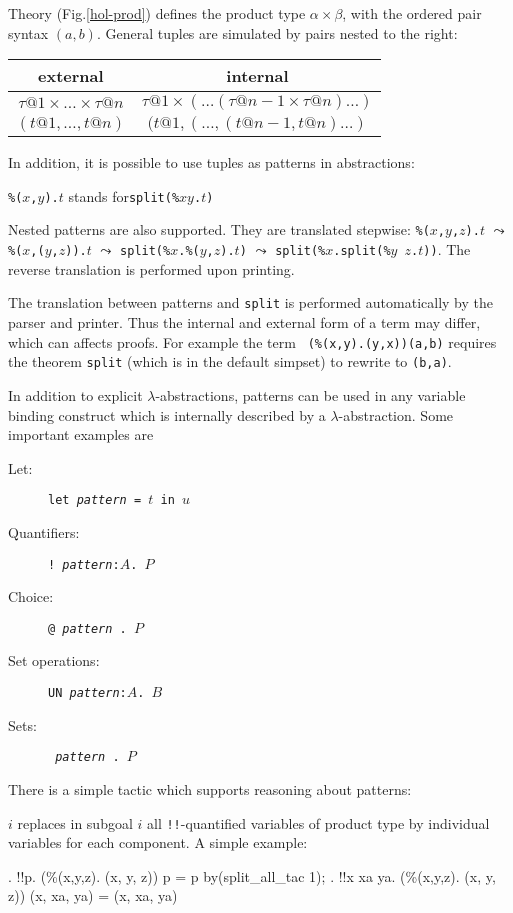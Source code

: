 Theory  (Fig.\ts\ref{hol-prod}) defines the product type
$\alpha\times\beta$, with the ordered pair syntax $(a, b)$.  General
tuples are simulated by pairs nested to the right:
\begin{center}
\begin{tabular}{|c|c|}
\hline
external & internal \\
\hline
$\tau@1 \times \dots \times \tau@n$ & $\tau@1 \times (\dots (\tau@{n-1} \times \tau@n)\dots)$ \\
\hline
$(t@1,\dots,t@n)$ & $(t@1,(\dots,(t@{n-1},t@n)\dots)$ \\
\hline
\end{tabular}
\end{center}
In addition, it is possible to use tuples
as patterns in abstractions:
\begin{center}
{\tt\%($x$,$y$).$t$} \quad stands for\quad \texttt{split(\%$x$\thinspace$y$.$t$)} 
\end{center}
Nested patterns are also supported.  They are translated stepwise:
{\tt\%($x$,$y$,$z$).$t$} $\leadsto$ {\tt\%($x$,($y$,$z$)).$t$} $\leadsto$
{\tt split(\%$x$.\%($y$,$z$).$t$)} $\leadsto$ \texttt{split(\%$x$.split(\%$y$
  $z$.$t$))}.  The reverse translation is performed upon printing.
\begin{warn}
  The translation between patterns and \texttt{split} is performed automatically
  by the parser and printer.  Thus the internal and external form of a term
  may differ, which can affects proofs.  For example the term {\tt
  (\%(x,y).(y,x))(a,b)} requires the theorem \texttt{split} (which is in the
  default simpset) to rewrite to {\tt(b,a)}.
\end{warn}
In addition to explicit $\lambda$-abstractions, patterns can be used in any
variable binding construct which is internally described by a
$\lambda$-abstraction.  Some important examples are
\begin{description}
\item[Let:] \texttt{let {\it pattern} = $t$ in $u$}
\item[Quantifiers:] \texttt{!~{\it pattern}:$A$.~$P$}
\item[Choice:] {\underscoreon \tt @~{\it pattern}~.~$P$}
\item[Set operations:] \texttt{UN~{\it pattern}:$A$.~$B$}
\item[Sets:] \texttt{{\ttlbrace}~{\it pattern}~.~$P$~{\ttrbrace}}
\end{description}

There is a simple tactic which supports reasoning about patterns:
\begin{ttdescription}
\item[\ttindexbold{split_all_tac} $i$] replaces in subgoal $i$ all
  {\tt!!}-quantified variables of product type by individual variables for
  each component.  A simple example:
\begin{ttbox}
{. !!p. (\%(x,y,z). (x, y, z)) p = p}
by(split_all_tac 1);
{. !!x xa ya. (\%(x,y,z). (x, y, z)) (x, xa, ya) = (x, xa, ya)}
\end{ttbox}
\end{ttdescription}

